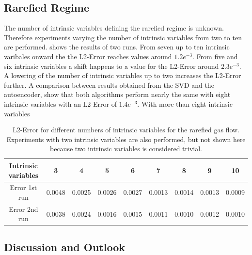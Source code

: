 \documentclass[12pt, a4paper]{article}
\begin{document}
\subsection{Rarefied Regime}
The number of intrinsic variables defining the rarefied regime is unknown. Therefore experiments varying the number of intrinsic variables from two to ten are performed.  shows the results of two runs. From seven up to ten intrinsic varibales onward the the L2-Error reaches values around \(1.2e^{-3}\). From five and six intrinsic variables a shift happens to a value for the L2-Error around \(2.3e^{-3}\). A lowering of the number of intrinsic variables up to two increases the L2-Error further. A comparison between results obtained from the SVD and the autoencoder, show that both algorithms perform nearly the same with eight intrinsic variables with an L2-Error of \(1.4e^{-3}\). With more than eight intrinsic variables  
\begin{table}[!htbp]\centering
	\begin{tabular}{ |c|c|c|c|c|c|c|c|c| }
		\hline
		Intrinsic variables  & 3 & 4 & 5 & 6 & 7 & 8 & 9 & 10 \\ [.5ex]
		\hline
		Error 1st run & 0.0048 & 0.0025 & 0.0026 & 0.0027 & 0.0013 & 0.0014 & 0.0013 & 0.0009\\ \hline
		Error 2nd run & 0.0038 & 0.0024 & 0.0016 & 0.0015 & 0.0011 & 0.0010 & 0.0012 & 0.0010\\\hline
	\end{tabular}
	\caption{L2-Error for different numbers of intrinsic variables for the rarefied gas flow. Experiments with two intrinsic variables are also performed, but not shown here because two intrinsic variables is considered trivial.}
	\label{Tab:Intrinsic units}
\end{table}
\subsection{Discussion and Outlook}
\newpage
{}

\newpage
\end{document}
